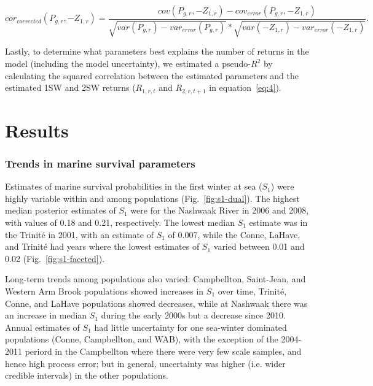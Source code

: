 \documentclass[12pt]{article}
\newcommand{\So}{$S_{1}$\xspace}
\begin{document}
\begin{equation}
cor_{corrected}(P_{g,r},-Z_{1,r}) = \frac{cov(P_{g,r}, -Z_{1,r}) - cov_{error}(P_{g,r}, -Z_{1,r})}
{\sqrt{var(P_{g,r})- var_{error}(P_{g,r})}*\sqrt{var(-Z_{1,r}) - var_{error}(-Z_{1,r})}}\label{eq:corparam}.
\end{equation}

Lastly, to determine what parameters best explains the number of returns in
the model (including the model uncertainty), we estimated a pseudo-$R^2$ by
calculating the squared correlation between the estimated parameters and the
estimated 1SW and 2SW returns ($R_{1,r,t}$ and $R_{2,r,t+1}$ in
equation~\ref{eq:4}).



\section*{Results}


\subsubsection*{Trends in marine survival parameters}

Estimates of marine survival probabilities in the first winter at sea (\So) were 
highly variable within and among populations
(Fig.~\ref{fig:s1-dual}). The highest median posterior estimates of \So
were for the Nashwaak River in 2006 and 2008, with values of 0.18 and 0.21,
respectively. The lowest median \So estimate was in the Trinit\'{e} in 2001,
with an estimate of \So of 0.007, while the Conne, LaHave, and Trinit\'{e} had
years where the lowest estimates of \So varied between 0.01 and 0.02 (Fig.~\ref{fig:s1-faceted}).

Long-term trends among populations also varied: Campbellton,
Saint-Jean, and Western Arm Brook populations showed increases in \So
over time, Trinit\'{e}, Conne, and LaHave populations showed decreases,
while at Nashwaak there was an increase in median \So during the early
2000s but a decrease since 2010. Annual estimates of \So had little
uncertainty for one sea-winter dominated populations (Conne, Campbellton, and
WAB), with the exception of the 2004-2011 periord in the Campbellton where
there were very few scale samples, and hence high process error; but in general, 
uncertainty was higher (i.e. wider credible intervals) in the other
populations.
\end{document}
